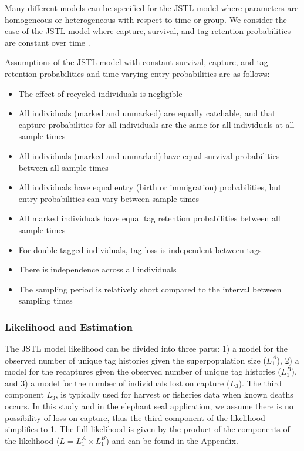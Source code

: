 \documentclass[]{article}
\providecommand{\tightlist}{%
  \setlength{\itemsep}{0pt}\setlength{\parskip}{0pt}}
\begin{document}
Many different models can be specified for the JSTL model where
parameters are homogeneous or heterogeneous with respect to time or
group. We consider the case of the JSTL model where capture, survival,
and tag retention probabilities are constant over time \citep{Cowen:2006}.

Assumptions of the JSTL model with constant survival, capture, and tag
retention probabilities and time-varying entry probabilities are as
follows:

\begin{itemize}
\tightlist
\item
  The effect of recycled individuals is negligible
\item
  All individuals (marked and unmarked) are equally catchable, and that
  capture probabilities for all individuals are the same for all
  individuals at all sample times
\item
  All individuals (marked and unmarked) have equal survival
  probabilities between all sample times
\item
  All individuals have equal entry (birth or immigration) probabilities,
  but entry probabilities can vary between sample times
\item
  All marked individuals have equal tag retention probabilities between
  all sample times
\item
  For double-tagged individuals, tag loss is independent between tags
\item
  There is independence across all individuals
\item
  The sampling period is relatively short compared to the interval
  between sampling times
\end{itemize}

\subsubsection{Likelihood and
Estimation}\label{likelihood-and-estimation}

The JSTL model likelihood can be divided into three parts: 1) a model for the observed number of unique tag histories given the superpopulation size ($L_1^A$), 2) a model for the recaptures given the observed number of unique tag histories ($L_1^B$), and 3) a model for the number of individuals lost on capture ($L_3$).  The third component $L_3$, is typically used for harvest or fisheries data when known deaths occurs.  In this study and in the elephant seal application, we assume there is no possibility of loss on capture, thus the third component of the likelihood simplifies to 1. The
full likelihood is given by the product of the components of the
likelihood (\(L=L_1^A \times L_1^B\)) and can be found in the Appendix.
\end{document}
